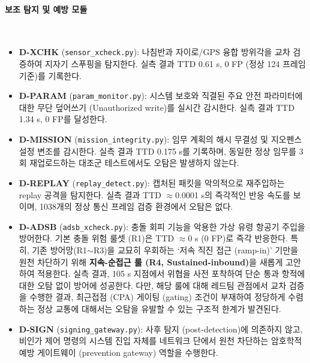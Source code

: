 \paragraph{\textbf{보조 탐지 및 예방 모듈}} ~\\
\vspace{-1.5em}
\begin{itemize}[leftmargin=*]
    \item \textbf{D-XCHK} (\texttt{sensor\_xcheck.py}): 나침반과 자이로/GPS 융합 방위각을 교차 검증하여 지자기 스푸핑을 탐지한다. 실측 결과 TTD 0.61 s, 0 FP (정상 124 프레임 기준)를 기록한다.
    \item \textbf{D-PARAM} (\texttt{param\_monitor.py}): 시스템 보호와 직결된 주요 안전 파라미터에 대한 무단 덮어쓰기 (Unauthorized write)를 실시간 감시한다. 실측 결과 TTD 1.34 s, 0 FP를 달성한다.
    \item \textbf{D-MISSION} (\texttt{mission\_integrity.py}): 임무 계획의 해시 무결성 및 지오펜스 설정 변조를 감시한다. 실측 결과 TTD 0.175 s를 기록하며, 동일한 정상 임무를 3회 재업로드하는 대조군 테스트에서도 오탐은 발생하지 않는다.  
    \item \textbf{D-REPLAY} (\texttt{replay\_detect.py}): 캡처된 패킷을 악의적으로 재주입하는 replay 공격을 탐지한다. 실측 결과 TTD $\approx$0.0001 s의 즉각적인 반응 속도를 보이며, 1038개의 정상 통신 프레임 검증 환경에서 오탐은 없다.    
    \item \textbf{D-ADSB} (\texttt{adsb\_xcheck.py}): 충돌 회피 기능을 악용한 가상 유령 항공기 주입을 방어한다. 기본 충돌 위험 룰셋 (R1)은 TTD $\approx$0 s (0 FP)로 즉각 반응한다. 특히, 기존 방어망(R1$\sim$R3)을 교묘히 우회하는 `저속 직진 접근 (ramp-in)' 기만을 원천 차단하기 위해 \textbf{지속-순접근 룰 (R4, Sustained-inbound)}을 새롭게 고안하여 적용한다. 실측 결과, 105 s 지점에서 위협을 사전 포착하여 단순 통과 항적에 대한 오탐 없이 방어에 성공한다. 다만, 해당 룰에 대해 레드팀 관점에서 교차 검증을 수행한 결과, 최근접점 (CPA) 게이팅 (gating) 조건이 부재하여 정당하게 수렴하는 정상 교통에 대해서는 오탐을 유발할 수 있는 구조적 한계가 발견된다.  
    \item \textbf{D-SIGN} (\texttt{signing\_gateway.py}): 사후 탐지 (post-detection)에 의존하지 않고, 비인가 제어 명령의 시스템 진입 자체를 네트워크 단에서 원천 차단하는 암호학적 예방 게이트웨이 (prevention gateway) 역할을 수행한다.
\end{itemize}
